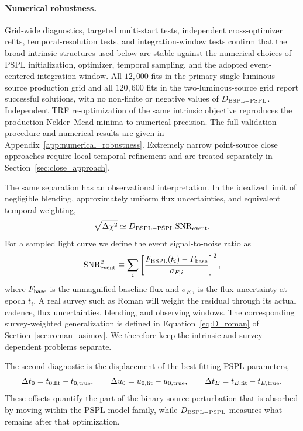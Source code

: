 \documentclass{article}
\begin{document}
\paragraph{Numerical robustness.}
Grid-wide diagnostics, targeted multi-start tests, independent
cross-optimizer refits, temporal-resolution tests, and
integration-window tests confirm that the broad intrinsic structures
used below are stable against the numerical choices of PSPL
initialization, optimizer, temporal sampling, and the adopted
event-centered integration window. All $12{,}000$ fits in the primary
single-luminous-source production grid and all $120{,}600$ fits in the
two-luminous-source grid report successful solutions, with no non-finite
or negative values of $D_{\rm BSPL-PSPL}$. Independent TRF
re-optimization of the same intrinsic objective reproduces the
production Nelder--Mead minima to numerical precision. The full
validation procedure and numerical results are given in
Appendix~\ref{app:numerical_robustness}. Extremely narrow point-source
close approaches require local temporal refinement and are treated
separately in Section~\ref{sec:close_approach}.

The same separation has an observational interpretation. In the
idealized limit of negligible blending, approximately uniform flux
uncertainties, and equivalent temporal weighting,
\begin{equation}
\sqrt{\Delta\chi^2}
\simeq
D_{\rm BSPL-PSPL}\,
{\rm SNR}_{\rm event}.
\end{equation}
For a sampled light curve we define the event signal-to-noise ratio as
\begin{equation}
{\rm SNR}_{\rm event}^{2}
\equiv
\sum_i
\left[
\frac{F_{\rm BSPL}(t_i)-F_{\rm base}}{\sigma_{F,i}}
\right]^2,
\label{eq:event_snr}
\end{equation}
where $F_{\rm base}$ is the unmagnified baseline flux and
$\sigma_{F,i}$ is the flux uncertainty at epoch $t_i$. A real survey
such as Roman will weight the residual through its actual cadence, flux
uncertainties, blending, and observing windows. The corresponding
survey-weighted generalization is defined in
Equation~\ref{eq:D_roman} of Section~\ref{sec:roman_asimov}. We therefore
keep the intrinsic and survey-dependent problems separate.

The second diagnostic is the displacement of the best-fitting PSPL
parameters,
\begin{equation}
\Delta t_0=t_{0,\rm fit}-t_{0,\rm true},
\qquad
\Delta u_0=u_{0,\rm fit}-u_{0,\rm true},
\qquad
\Delta t_E=t_{E,\rm fit}-t_{E,\rm true}.
\end{equation}
These offsets quantify the part of the binary-source perturbation that
is absorbed by moving within the PSPL model family, while
$D_{\rm BSPL-PSPL}$ measures what remains after that optimization.
\end{document}
